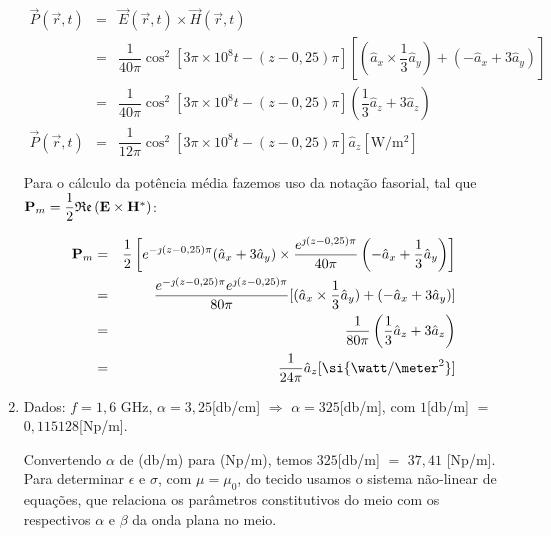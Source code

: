 \begin{enumerate}[1.]
\begin{eqnarray*}
  \vec{P}(\vec{r},t) & = & \vec{E}(\vec{r},t) \times \vec{H}(\vec{r},t) \nonumber \\
  & = & \dfrac{1}{40\pi}\cos^{2}[3\pi \times 10^{8}t - (z - 0,25)\pi][(\hat{a}_{x} \times \dfrac{1}{3} \hat{a}_{y}) + (-\hat{a}_{x} + 3\hat{a}_{y})] \nonumber \\
  & = & \dfrac{1}{40\pi}\cos^{2}[3\pi \times 10^{8}t - (z - 0,25)\pi](\dfrac{1}{3}\hat{a}_{z} + 3\hat{a}_{z}) \nonumber \\
  \vec{P}(\vec{r},t) & = &  \dfrac{1}{12\pi}\cos^{2}[3\pi \times 10^{8}t - (z - 0,25)\pi] \hat{a}_{z} [\si{\watt/\meter^{2}}] \nonumber
\end{eqnarray*}

Para o cálculo da potência média fazemos uso da notação fasorial, tal que ${\bf P}_{m} = \dfrac{1}{2}\mathfrak{Re}\left({\bf E} \times {\bf H}^{*} \right)$:

\begin{eqnarray*}  
  {\bf P}_{m} & = & \dfrac{1}{2}\left[e^{-\jmath (z - 0,25)\pi}(\hat{a}_{x} + 3\hat{a}_{y}) \times \dfrac{e^{\jmath (z - 0,25)\pi}}{40\pi}\left(-\hat{a}_{x} + \dfrac{1}{3}\hat{a}_{y}\right)\right] \nonumber \\
  & = & \dfrac{e^{-\jmath (z - 0,25)\pi} e^{\jmath (z - 0,25)\pi}}{80\pi} [(\hat{a}_{x} \times \dfrac{1}{3} \hat{a}_{y}) + \left(-\hat{a}_{x} + 3\hat{a}_{y}\right)] \nonumber \\
  & = & \dfrac{1}{80\pi}\left(\dfrac{1}{3}\hat{a}_{z} + 3\hat{a}_{z}\right) \nonumber \\
  & = & \dfrac{1}{24\pi} \hat{a}_{z}[\si{\watt/\meter^{2}}] \nonumber
\end{eqnarray*}

\newpage

\item Dados: $f = 1,6$ \si{\giga\hertz}, $\alpha = 3,25$[\si{\decibel/\centi\metre}] $\Rightarrow$ $\alpha = 325$[\si{\decibel/\metre}], com $1$[\si{\decibel/\meter}] $=$ $0,115128$[\si{\neper/\meter}]. %

Convertendo $\alpha$ de (\si{\decibel/\metre}) para (\si{\neper/\meter}), temos $325$[\si{\decibel/\metre}] $=$ $37,41$ [\si{\neper/\meter}]. Para determinar $\epsilon$ e $\sigma$, com $\mu = \mu_{0}$, do tecido usamos o sistema não-linear de equações, que relaciona os parâmetros constitutivos do meio com os respectivos $\alpha$ e $\beta$ da onda plana no meio.


\end{enumerate}
